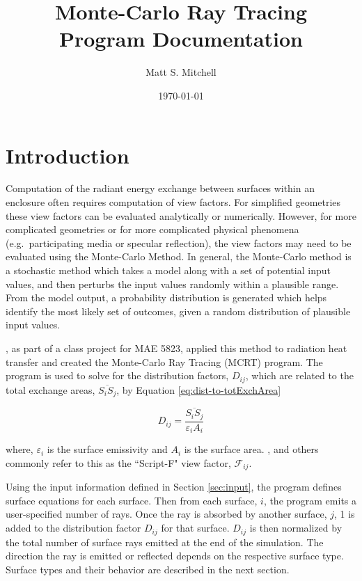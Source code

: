 \documentclass{article}
\title{\textbf{Monte-Carlo Ray Tracing} \\ Program Documentation}
\date{\today}
\author{Matt S. Mitchell}
\begin{document}
\maketitle
\clearpage
\tableofcontents
\clearpage

\section{Introduction}

Computation of the radiant energy exchange between surfaces within an enclosure often requires computation of view factors. For simplified geometries these view factors can be evaluated analytically or numerically. However, for more complicated geometries or for more complicated physical phenomena (e.g.~participating media or specular reflection), the view factors may need to be evaluated using the Monte-Carlo Method. In general, the Monte-Carlo method is a stochastic method which takes a model along with a set of potential input values, and then perturbs the input values randomly within a plausible range. From the model output, a probability distribution is generated which helps identify the most likely set of outcomes, given a random distribution of plausible input values.

\cite{Nigusse2004}, as part of a class project for MAE 5823, applied this method to radiation heat transfer and created the Monte-Carlo Ray Tracing (MCRT) program. The program is used to solve for the distribution factors, $D_{ij}$, which are related to the total exchange areas, $\overline{S_i S_j}$, by Equation \ref{eq:dist-to-totExchArea}

\begin{equation}
	D_{ij} = \frac{\overline{S_i S_j}}{\varepsilon_i A_i}
	\label{eq:dist-to-totExchArea}
\end{equation}

where, $\varepsilon_i$ is the surface emissivity and $A_i$ is the surface area. \cite{Modest2003}, and others commonly refer to this as the ``Script-F" view factor, $\mathscr{F}_{ij}$.

Using the input information defined in Section \ref{sec:input}, the program defines surface equations for each surface. Then from each surface, $i$, the program emits a user-specified number of rays. Once the ray is absorbed by another surface, $j$, 1 is added to the distribution factor $D_{ij}$ for that surface. $D_{ij}$ is then normalized by the total number of surface rays emitted at the end of the simulation. The direction the ray is emitted or reflected depends on the respective surface type. Surface types and their behavior are described in the next section.
\end{document}
